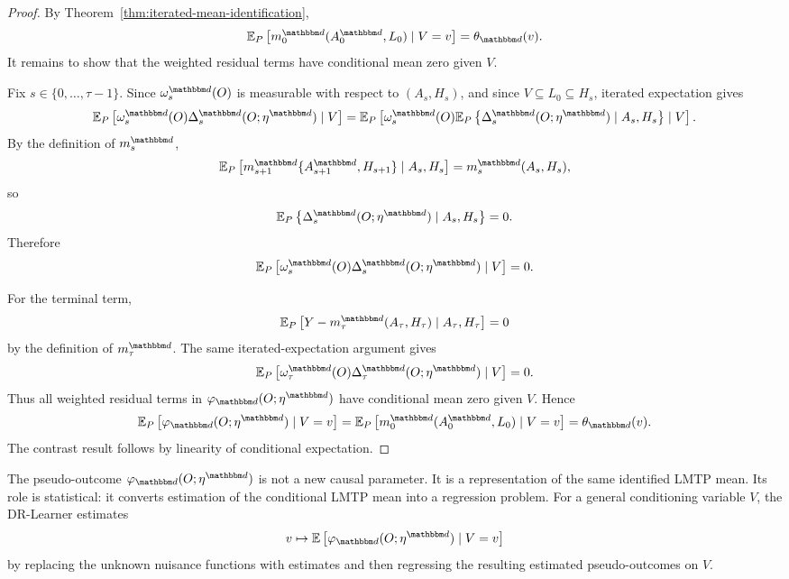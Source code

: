 \documentclass[11pt]{article}
\begin{document}
\begin{proof}
By Theorem~\ref{thm:iterated-mean-identification},
\[
  \mathbb{E}_{P}
  \left[
    m_0^{\mathbbm d}(A_0^{\mathbbm d},L_0)
    \mid V=v
  \right]
  =
  \theta_{\mathbbm d}(v).
\]
It remains to show that the weighted residual terms have conditional mean zero
given \(V\).

Fix \(s\in\{0,\ldots,\tau-1\}\). Since
\(\omega_s^{\mathbbm d}(O)\) is measurable with respect to
\((A_s,H_s)\), and since \(V\subseteq L_0\subseteq H_s\), iterated expectation
gives
\[
  \mathbb{E}_{P}
  \left[
    \omega_s^{\mathbbm d}(O)
    \Delta_s^{\mathbbm d}(O;\eta^{\mathbbm d})
    \mid V
  \right]
  =
  \mathbb{E}_{P}
  \left[
    \omega_s^{\mathbbm d}(O)
    \mathbb{E}_{P}
    \left\{
      \Delta_s^{\mathbbm d}(O;\eta^{\mathbbm d})
      \mid A_s,H_s
    \right\}
    \mid V
  \right].
\]
By the definition of \(m_s^{\mathbbm d}\),
\[
  \mathbb{E}_{P}
  \left[
    m_{s+1}^{\mathbbm d}
    \{A_{s+1}^{\mathbbm d},H_{s+1}\}
    \mid A_s,H_s
  \right]
  =
  m_s^{\mathbbm d}(A_s,H_s),
\]
so
\[
  \mathbb{E}_{P}
  \left\{
    \Delta_s^{\mathbbm d}(O;\eta^{\mathbbm d})
    \mid A_s,H_s
  \right\}
  =
  0.
\]
Therefore
\[
  \mathbb{E}_{P}
  \left[
    \omega_s^{\mathbbm d}(O)
    \Delta_s^{\mathbbm d}(O;\eta^{\mathbbm d})
    \mid V
  \right]
  =
  0.
\]

For the terminal term,
\[
  \mathbb{E}_{P}
  \left[
    Y - m_\tau^{\mathbbm d}(A_\tau,H_\tau)
    \mid A_\tau,H_\tau
  \right]
  =
  0
\]
by the definition of \(m_\tau^{\mathbbm d}\). The same iterated-expectation
argument gives
\[
  \mathbb{E}_{P}
  \left[
    \omega_\tau^{\mathbbm d}(O)
    \Delta_\tau^{\mathbbm d}(O;\eta^{\mathbbm d})
    \mid V
  \right]
  =
  0.
\]
Thus all weighted residual terms in
\(\varphi_{\mathbbm d}(O;\eta^{\mathbbm d})\) have conditional mean zero given
\(V\). Hence
\[
  \mathbb{E}_{P}
  \left[
    \varphi_{\mathbbm d}(O;\eta^{\mathbbm d})
    \mid V=v
  \right]
  =
  \mathbb{E}_{P}
  \left[
    m_0^{\mathbbm d}(A_0^{\mathbbm d},L_0)
    \mid V=v
  \right]
  =
  \theta_{\mathbbm d}(v).
\]
The contrast result follows by linearity of conditional expectation.
\end{proof}

\begin{remark}
\label{rem:pseudooutcome-role}
The pseudo-outcome
\(\varphi_{\mathbbm d}(O;\eta^{\mathbbm d})\) is not a new causal parameter. It
is a representation of the same identified LMTP mean. Its role is statistical:
it converts estimation of the conditional LMTP mean into a regression problem.
For a general conditioning variable \(V\), the DR-Learner estimates
\[
  v
  \mapsto
  \mathbb{E}
  \left[
    \varphi_{\mathbbm d}(O;\eta^{\mathbbm d})
    \mid V=v
  \right]
\]
by replacing the unknown nuisance functions with estimates and then regressing
the resulting estimated pseudo-outcomes on \(V\).
\end{remark}
\end{document}
